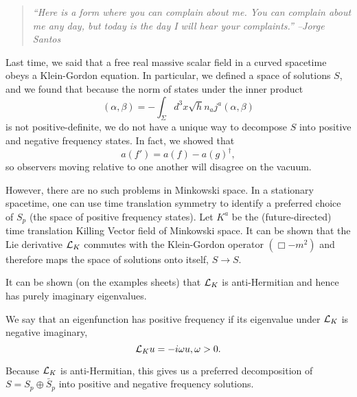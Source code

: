 \begin{quote}
    \textit{``Here is a form where you can complain about me. You can complain about me any day, but today is the day I will hear your complaints.'' --Jorge Santos}
\end{quote}

Last time, we said that a free real massive scalar field in a curved spacetime obeys a Klein-Gordon equation. In particular, we defined a space of solutions $S$, and we found that because the norm of states under the inner product
\begin{equation}
    (\alpha,\beta)=-\int_\Sigma d^3x \sqrt{h} n_a j^a(\alpha,\beta)
\end{equation}
is not positive-definite, we do not have a unique way to decompose $S$ into positive and negative frequency states. In fact, we showed that 
\begin{equation}
    a(f')=a(f) -a(g)^\dagger,
\end{equation}
so observers moving relative to one another will disagree on the vacuum.

However, there are no such problems in Minkowski space. In a stationary spacetime, one can use time translation symmetry to identify a preferred choice of $S_p$ (the space of positive frequency states). Let $K^a$ be the (future-directed) time translation Killing Vector field of Minkowski space. It can be shown that the Lie derivative $\mathcal L_K$ commutes with the Klein-Gordon operator $(\Box -m^2)$ and therefore maps the space of solutions onto itself, $S\to S$.

It can be shown (on the examples sheets) that $\mathcal L_K$ is anti-Hermitian and hence has purely imaginary eigenvalues.
\begin{defn}
    We say that an eigenfunction has positive frequency if its eigenvalue under $\mathcal L_K$ is negative imaginary,
    \begin{equation}
        \mathcal L_K u= -i \omega u, \omega > 0.
    \end{equation}
\end{defn}
Because $\mathcal L_K$ is anti-Hermitian, this gives us a preferred decomposition of $S=S_p \oplus \bar S_p$ into positive and negative frequency solutions.

